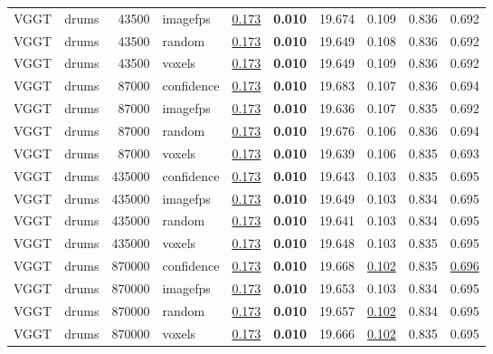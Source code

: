 \begin{table}[H]
\begin{tabular}{llrlrrrrrr}
VGGT & drums & 43500 & imagefps & \underline{0.173} & \textbf{0.010} & 19.674 & 0.109 & 0.836 & 0.692 \\
VGGT & drums & 43500 & random & \underline{0.173} & \textbf{0.010} & 19.649 & 0.108 & 0.836 & 0.692 \\
VGGT & drums & 43500 & voxels & \underline{0.173} & \textbf{0.010} & 19.649 & 0.109 & 0.836 & 0.692 \\
VGGT & drums & 87000 & confidence & \underline{0.173} & \textbf{0.010} & 19.683 & 0.107 & 0.836 & 0.694 \\
VGGT & drums & 87000 & imagefps & \underline{0.173} & \textbf{0.010} & 19.636 & 0.107 & 0.835 & 0.692 \\
VGGT & drums & 87000 & random & \underline{0.173} & \textbf{0.010} & 19.676 & 0.106 & 0.836 & 0.694 \\
VGGT & drums & 87000 & voxels & \underline{0.173} & \textbf{0.010} & 19.639 & 0.106 & 0.835 & 0.693 \\
VGGT & drums & 435000 & confidence & \underline{0.173} & \textbf{0.010} & 19.643 & 0.103 & 0.835 & 0.695 \\
VGGT & drums & 435000 & imagefps & \underline{0.173} & \textbf{0.010} & 19.649 & 0.103 & 0.834 & 0.695 \\
VGGT & drums & 435000 & random & \underline{0.173} & \textbf{0.010} & 19.641 & 0.103 & 0.834 & 0.695 \\
VGGT & drums & 435000 & voxels & \underline{0.173} & \textbf{0.010} & 19.648 & 0.103 & 0.835 & 0.695 \\
VGGT & drums & 870000 & confidence & \underline{0.173} & \textbf{0.010} & 19.668 & \underline{0.102} & 0.835 & \underline{0.696} \\
VGGT & drums & 870000 & imagefps & \underline{0.173} & \textbf{0.010} & 19.653 & 0.103 & 0.834 & 0.695 \\
VGGT & drums & 870000 & random & \underline{0.173} & \textbf{0.010} & 19.657 & \underline{0.102} & 0.834 & 0.695 \\
VGGT & drums & 870000 & voxels & \underline{0.173} & \textbf{0.010} & 19.666 & \underline{0.102} & 0.835 & 0.695 \\
\bottomrule
\end{tabular}
\end{table}